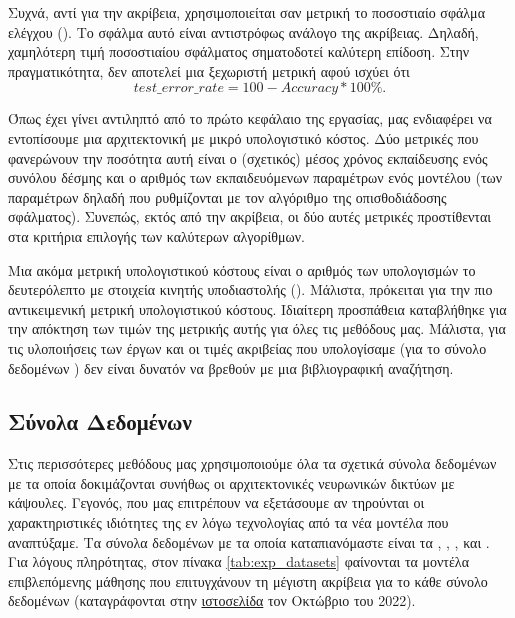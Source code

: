 Συχνά, αντί για την ακρίβεια, χρησιμοποιείται σαν μετρική το ποσοστιαίο σφάλμα ελέγχου (). Το σφάλμα αυτό είναι αντιστρόφως ανάλογο της ακρίβειας. Δηλαδή, χαμηλότερη τιμή ποσοστιαίου σφάλματος σηματοδοτεί καλύτερη επίδοση. Στην πραγματικότητα, δεν αποτελεί μια ξεχωριστή μετρική αφού ισχύει ότι $$test\_error\_rate = 100 - Accuracy*100\%.$$ \par

Όπως έχει γίνει αντιληπτό από το πρώτο κεφάλαιο της εργασίας, μας ενδιαφέρει να εντοπίσουμε μια αρχιτεκτονική με μικρό υπολογιστικό κόστος. Δύο μετρικές που φανερώνουν την ποσότητα αυτή είναι ο (σχετικός) μέσος χρόνος εκπαίδευσης ενός συνόλου δέσμης και ο αριθμός των εκπαιδευόμενων παραμέτρων ενός μοντέλου (των παραμέτρων δηλαδή που ρυθμίζονται με τον αλγόριθμο της οπισθοδιάδοσης σφάλματος). Συνεπώς, εκτός από την ακρίβεια, οι δύο αυτές μετρικές προστίθενται στα κριτήρια επιλογής των καλύτερων αλγορίθμων.\par
Μια ακόμα μετρική υπολογιστικού κόστους είναι ο αριθμός των υπολογισμών το δευτερόλεπτο με στοιχεία κινητής υποδιαστολής (). Μάλιστα, πρόκειται για την πιο αντικειμενική μετρική υπολογιστικού κόστους. Ιδιαίτερη προσπάθεια καταβλήθηκε για την απόκτηση των τιμών της μετρικής αυτής για όλες τις μεθόδους μας. Μάλιστα, για τις υλοποιήσεις των έργων \cite{sabour2017dynamic} και \cite{hinton2018matrix} οι τιμές ακριβείας που υπολογίσαμε (για το σύνολο δεδομένων ) δεν είναι δυνατόν να βρεθούν με μια βιβλιογραφική αναζήτηση.

\subsection{Σύνολα Δεδομένων}
Στις περισσότερες μεθόδους μας χρησιμοποιούμε όλα τα σχετικά σύνολα δεδομένων με τα οποία δοκιμάζονται συνήθως οι αρχιτεκτονικές νευρωνικών δικτύων με κάψουλες. Γεγονός, που μας επιτρέπουν να εξετάσουμε αν τηρούνται οι χαρακτηριστικές ιδιότητες της εν λόγω τεχνολογίας από τα νέα μοντέλα που αναπτύξαμε. Τα σύνολα δεδομένων με τα οποία καταπιανόμαστε είναι τα \cite{deng2012mnist}, \cite{Xiao2017FashionMNISTAN}, \cite{CIFAR10}, \cite{sabour2017dynamic} και \cite{lecun2004learning}. Για λόγους πληρότητας, στον πίνακα \ref{tab:exp_datasets} φαίνονται τα μοντέλα επιβλεπόμενης μάθησης που επιτυγχάνουν τη μέγιστη ακρίβεια για το κάθε σύνολο δεδομένων (καταγράφονται στην \href{https://paperswithcode.com/}{ιστοσελίδα} τον Οκτώβριο του 2022).


